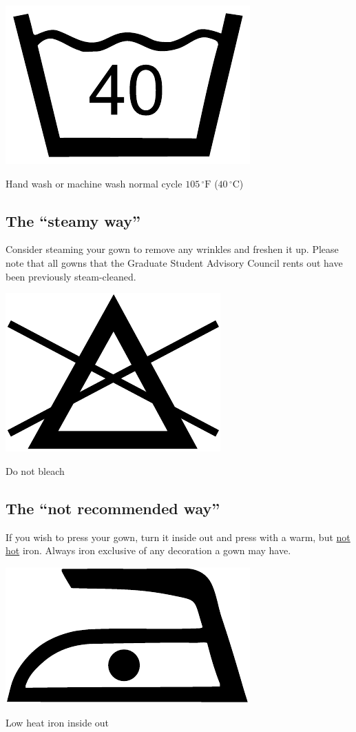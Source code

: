 \documentclass{tufte-handout}
\begin{document}
\begin{marginfigure}[-18\baselineskip]%
\hspace*{0.02in}
  \includegraphics[width=.35\linewidth]{40C}
  \caption{\linespread{1.3}\selectfont{}Hand wash or \hspace{\textwidth}machine wash normal cycle \hspace{\textwidth}$105\,^{\circ}\mathrm{F}$ ($40\,^{\circ}\mathrm{C}$)}
  \label{fig:40C}
\end{marginfigure}

\subsection{The ``steamy way''}
Consider steaming your gown to remove any wrinkles and freshen it up. Please note that all gowns that the Graduate Student Advisory Council rents out have been previously steam-cleaned.

\begin{marginfigure}[-18\baselineskip]%
\hspace*{0.01in}
  \includegraphics[width=.35\linewidth]{no-bleach}
  \caption{Do not bleach}
  \label{fig:bleach}
\end{marginfigure}

\subsection{The ``not recommended way''}
If you wish to press your gown, turn it inside out and press with a warm, but \underline{not hot} iron. Always iron exclusive of any decoration a gown may have. 

\begin{marginfigure}[-22\baselineskip]%
\hspace*{0.02in}
  \includegraphics[width=.35\linewidth]{low-heat-iron}
  \caption{Low heat iron inside out}
  \label{fig:iron}
\end{marginfigure}
\end{document}
